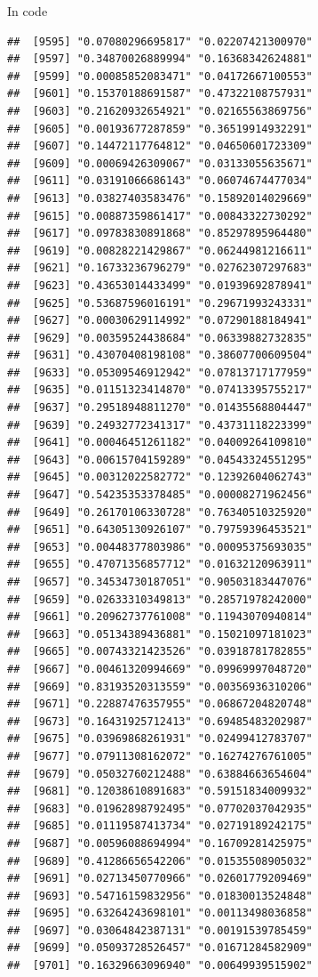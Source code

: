 \documentclass[ignorenonframetext,]{beamer}
\begin{document}
\begin{frame}[fragile]{In code}
\begin{verbatim}
##  [9595] "0.07080296695817" "0.02207421300970"
##  [9597] "0.34870026889994" "0.16368342624881"
##  [9599] "0.00085852083471" "0.04172667100553"
##  [9601] "0.15370188691587" "0.47322108757931"
##  [9603] "0.21620932654921" "0.02165563869756"
##  [9605] "0.00193677287859" "0.36519914932291"
##  [9607] "0.14472117764812" "0.04650601723309"
##  [9609] "0.00069426309067" "0.03133055635671"
##  [9611] "0.03191066686143" "0.06074674477034"
##  [9613] "0.03827403583476" "0.15892014029669"
##  [9615] "0.00887359861417" "0.00843322730292"
##  [9617] "0.09783830891868" "0.85297895964480"
##  [9619] "0.00828221429867" "0.06244981216611"
##  [9621] "0.16733236796279" "0.02762307297683"
##  [9623] "0.43653014433499" "0.01939692878941"
##  [9625] "0.53687596016191" "0.29671993243331"
##  [9627] "0.00030629114992" "0.07290188184941"
##  [9629] "0.00359524438684" "0.06339882732835"
##  [9631] "0.43070408198108" "0.38607700609504"
##  [9633] "0.05309546912942" "0.07813717177959"
##  [9635] "0.01151323414870" "0.07413395755217"
##  [9637] "0.29518948811270" "0.01435568804447"
##  [9639] "0.24932772341317" "0.43731118223399"
##  [9641] "0.00046451261182" "0.04009264109810"
##  [9643] "0.00615704159289" "0.04543324551295"
##  [9645] "0.00312022582772" "0.12392604062743"
##  [9647] "0.54235353378485" "0.00008271962456"
##  [9649] "0.26170106330728" "0.76340510325920"
##  [9651] "0.64305130926107" "0.79759396453521"
##  [9653] "0.00448377803986" "0.00095375693035"
##  [9655] "0.47071356857712" "0.01632120963911"
##  [9657] "0.34534730187051" "0.90503183447076"
##  [9659] "0.02633310349813" "0.28571978242000"
##  [9661] "0.20962737761008" "0.11943070940814"
##  [9663] "0.05134389436881" "0.15021097181023"
##  [9665] "0.00743321423526" "0.03918781782855"
##  [9667] "0.00461320994669" "0.09969997048720"
##  [9669] "0.83193520313559" "0.00356936310206"
##  [9671] "0.22887476357955" "0.06867204820748"
##  [9673] "0.16431925712413" "0.69485483202987"
##  [9675] "0.03969868261931" "0.02499412783707"
##  [9677] "0.07911308162072" "0.16274276761005"
##  [9679] "0.05032760212488" "0.63884663654604"
##  [9681] "0.12038610891683" "0.59151834009932"
##  [9683] "0.01962898792495" "0.07702037042935"
##  [9685] "0.01119587413734" "0.02719189242175"
##  [9687] "0.00596088694994" "0.16709281425975"
##  [9689] "0.41286656542206" "0.01535508905032"
##  [9691] "0.02713450770966" "0.02601779209469"
##  [9693] "0.54716159832956" "0.01830013524848"
##  [9695] "0.63264243698101" "0.00113498036858"
##  [9697] "0.03064842387131" "0.00191539785459"
##  [9699] "0.05093728526457" "0.01671284582909"
##  [9701] "0.16329663096940" "0.00649939515902"

\end{verbatim}
\end{frame}
\end{document}
